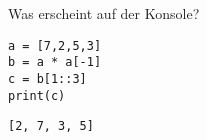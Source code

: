 \question[3]
Was erscheint auf der Konsole?
\begin{lstlisting}
a = [7,2,5,3]
b = a * a[-1]
c = b[1::3]
print(c)
\end{lstlisting}
\begin{solutionbox}{1cm}
\texttt{[2, 7, 3, 5]}
\end{solutionbox}

